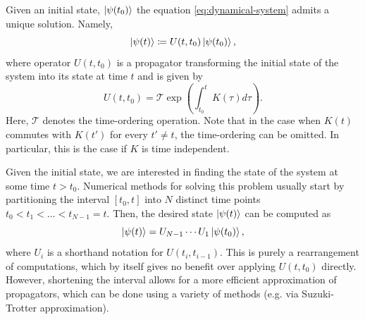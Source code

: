Given an initial state, $\ket{\psi(t_0)}$ the equation \eqref{eq:dynamical-system}
admits a unique solution. Namely,
\begin{equation}
    \ket{\psi(t)} \coloneqq U(t, t_0) \ket{\psi(t_0)},
\end{equation}
where operator $U(t, t_0)$ is a propagator transforming the initial state of
the system into its state at time $t$ and is given by
\begin{equation}
    \label{eq:propagator}
    U(t, t_0) = \mathcal{T} \exp \left( \int_{t_0}^t K(\tau)d\tau \right).
\end{equation}
Here, $\mathcal{T}$ denotes the time-ordering operation.
Note that in the case when $K(t)$ commutes with $K(t')$ for every $t' \ne t$, the
time-ordering can be omitted. In particular, this is the case if $K$ is time
independent.

Given the initial state, we are interested in finding the state of the
system at some time $t > t_0$. Numerical methods for solving this problem
usually start by partitioning the interval $[t_0, t]$ into $N$ distinct time
points $t_0 < t_1 < \ldots < t_{N-1} = t$. Then, the desired state $\ket{\psi(t)}$
can be computed as
%
\begin{equation}
\ket{\psi(t)} = U_{N-1} \cdots U_1 \ket{\psi(t_0)},
\end{equation}
%
where $U_i$ is a shorthand notation for $U(t_i, t_{i-1})$. This is purely a rearrangement of
computations, which by itself gives no benefit over applying $U(t, t_0)$ directly. However,
shortening the interval allows for a more efficient approximation of propagators, which can be done
using a variety of methods (e.g. via Suzuki-Trotter approximation).

